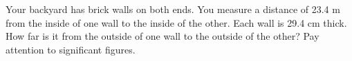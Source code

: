  Your backyard has brick walls on both ends. You measure a
distance of 23.4 m from the inside of one wall to the
inside of the other. Each wall is 29.4 cm thick. How far is
it from the outside of one wall to the outside of the other?
Pay attention to significant figures.
